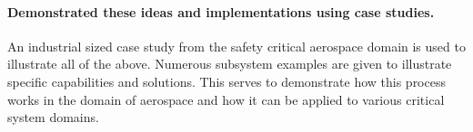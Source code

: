 \paragraph{Demonstrated these ideas and implementations using case studies.}
An industrial sized case study from the safety critical aerospace domain is used to illustrate all of the above. Numerous subsystem examples are given to illustrate specific capabilities and solutions. This serves to demonstrate how this process works in the domain of aerospace and how it can be applied to various critical system domains. 




